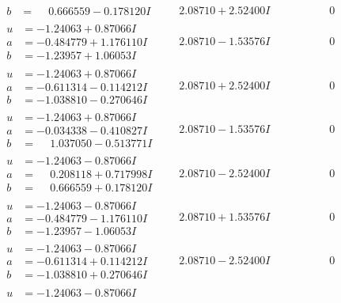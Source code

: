 \documentclass[1p]{elsarticle_modified}
\theoremstyle{definition}
\begin{document}
$$\begin{array}{c|c|c}
\begin{aligned}
b &= \phantom{-}0.666559 - 0.178120 I\end{aligned}
 & \phantom{-}2.08710 + 2.52400 I & \phantom{-0.000000 } 0 \\ \hline\begin{aligned}
u &= -1.24063 + 0.87066 I \\
a &= -0.484779 + 1.176110 I \\
b &= -1.23957 + 1.06053 I\end{aligned}
 & \phantom{-}2.08710 - 1.53576 I & \phantom{-0.000000 } 0 \\ \hline\begin{aligned}
u &= -1.24063 + 0.87066 I \\
a &= -0.611314 - 0.114212 I \\
b &= -1.038810 - 0.270646 I\end{aligned}
 & \phantom{-}2.08710 + 2.52400 I & \phantom{-0.000000 } 0 \\ \hline\begin{aligned}
u &= -1.24063 + 0.87066 I \\
a &= -0.034338 - 0.410827 I \\
b &= \phantom{-}1.037050 - 0.513771 I\end{aligned}
 & \phantom{-}2.08710 - 1.53576 I & \phantom{-0.000000 } 0 \\ \hline\begin{aligned}
u &= -1.24063 - 0.87066 I \\
a &= \phantom{-}0.208118 + 0.717998 I \\
b &= \phantom{-}0.666559 + 0.178120 I\end{aligned}
 & \phantom{-}2.08710 - 2.52400 I & \phantom{-0.000000 } 0 \\ \hline\begin{aligned}
u &= -1.24063 - 0.87066 I \\
a &= -0.484779 - 1.176110 I \\
b &= -1.23957 - 1.06053 I\end{aligned}
 & \phantom{-}2.08710 + 1.53576 I & \phantom{-0.000000 } 0 \\ \hline\begin{aligned}
u &= -1.24063 - 0.87066 I \\
a &= -0.611314 + 0.114212 I \\
b &= -1.038810 + 0.270646 I\end{aligned}
 & \phantom{-}2.08710 - 2.52400 I & \phantom{-0.000000 } 0 \\ \hline\begin{aligned}
u &= -1.24063 - 0.87066 I \\

\end{aligned}
\end{array}$$
\end{document}
